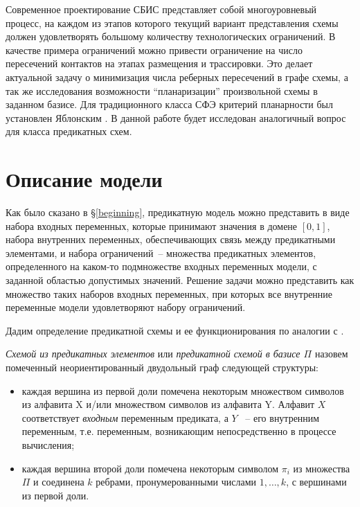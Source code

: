 \documentclass[12pt]{article}
\newenvironment{definition}[1][Определение]{\begin{trivlist}
\item[\hskip \labelsep {\bfseries #1}]}{\end{trivlist}}
\begin{document}
Современное проектирование СБИС представляет собой многоуровневый процесс, на каждом из этапов которого
текущий вариант представления схемы должен удовлетворять большому количеству технологических ограничений. 
В качестве примера ограничений можно привести ограничение на число пересечений контактов на этапах размещения и трассировки.
Это делает актуальной задачу о минимизация числа реберных пересечений в графе схемы, а так же исследования
возможности ``планаризации'' произвольной схемы в заданном базисе. Для традиционного класса СФЭ критерий планарности
был установлен Яблонским \cite{yabl_planar}. В данной работе будет исследован аналогичный вопрос для класса предикатных схем.

\clearpage
\section{Описание модели}

Как было сказано в \S \ref{beginning}, предикатную модель можно представить в виде набора входных переменных,
которые принимают значения в домене $[0, 1]$, набора внутренних переменных, 
обеспечивающих связь между предикатными элементами, и набора ограничений~-- множества
предикатных элементов, определенного на каком-то подмножестве входных переменных модели, 
с заданной областью допустимых значений.
Решение задачи можно представить как множество таких наборов входных переменных, при которых все внутренние
переменные модели удовлетворяют набору ограничений.

Дадим определение предикатной схемы и ее функционирования по аналогии с \cite{Shu11}.

\begin{definition}
\label{pred_def}
\textit{Схемой из предикатных элементов} или \textit{предикатной схемой в базисе $\Pi$} назовем помеченный
неориентированный двудольный граф следующей структуры:

\begin{itemize}
\item каждая вершина из первой доли помечена некоторым множеством символов из алфавита X и/или 
множеством символов из алфавита Y. 
Алфавит $X$ соответствует \textit{входным} переменным предиката, а $Y$ ~-- его внутренним переменным, 
т.е. переменным, возникающим непосредственно в процессе вычисления; 

\item каждая вершина второй доли помечена некоторым символом $\pi_i$ из множества $\Pi$ и 
соединена $k$ ребрами, пронумерованными числами $1, \dots, k$, с вершинами из первой доли.
\end{itemize}
\end{definition}
\end{document}
